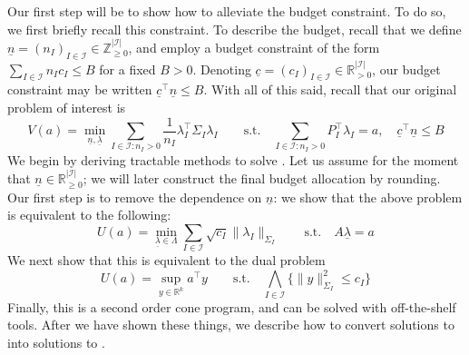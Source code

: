 \documentclass{article} %
\newcommand{\R}{\mathbb{R}}
\begin{document}
Our first step will be to show how to alleviate the budget constraint. To do so, we first briefly recall this constraint. To describe the budget, recall that we define $\underline{n}=(n_I)_{I\in\mathcal{I}}\in \mathbb{Z}_{\geq0}^{|\mathcal{I}|}$, and employ a budget constraint of the form $\sum_{I\in\mathcal{I}} n_Ic_I \leq B$ for a fixed $B>0$. Denoting $\underline{c}=(c_I)_{I\in\mathcal{I}}\in\R_{>0}^{|\mathcal{I}|}$, our budget constraint may be written $\underline{c}^\top\underline{n}\leq B$. With all of this said, recall that our original problem of interest is
\begin{equation}\label{eqn:og}
    V(a) = \min_{\underline{n},\underline{\lambda}} \sum_{I\in\mathcal{I}:n_I>0} \frac{1}{n_I}\lambda_I^\top\Sigma_I\lambda_I\quad\quad\text{s.t.}\quad 
    \sum_{I\in\mathcal{I}:n_I>0}P_I^\top \lambda_I=a,\quad     \underline{c}^\top\underline{n}\leq B
\end{equation}
We begin by deriving tractable methods to solve . Let us assume for the moment that $\underline{n}\in\R_{\geq0}^{|\mathcal{I}|}$; we will later construct the final budget allocation by rounding. Our first step is to remove the dependence on $\underline{n}$: we show that the above problem is equivalent to the following:
\begin{equation}\label{eqn:primal}
    U(a)=\min_{\underline{\lambda}\in\Lambda} \sum_{I\in\mathcal{I}} \sqrt{c_I}\|\lambda_I\|_{\Sigma_I}\quad\quad\text{s.t.}\quad A\underline{\lambda} = a
\end{equation}
We next show that this is equivalent to the dual problem
\begin{equation}\label{eqn:dual}
    U(a) = \sup_{y\in \R^k} a^\top y \quad\quad\text{s.t.}\quad \bigwedge_{I\in\mathcal{I}} \big\{\|y\|_{\Sigma_I}^2\leq c_I\big\}
\end{equation}
Finally, this is a second order cone program, and can be solved with off-the-shelf tools. After we have shown these things, we describe how to convert solutions to  into solutions to .
\end{document}

